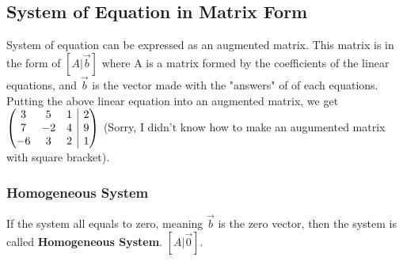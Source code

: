 \documentclass[12pt]{article}
\makeatletter
\newenvironment{amatrix}[1]{%
  \left(\begin{array}{@{}*{#1}{c}|c@{}}
}{%
  \end{array}\right)
}
\makeatother
\begin{document}
\subsection{System of Equation in Matrix Form}
System of equation can be expressed as an augmented matrix. This matrix is in the form of $[A|\vec{b}]$ where A is a matrix formed by the coefficients of the linear equations, and $\vec{b}$ is the vector made with the "answers" of of each equations. 
Putting the above linear equation into an augmented matrix, we get 
$
\begin{amatrix}{3}
   3 & 5 & 1 &2 \\ 7 & -2 &4 &9\\-6&3&2&1\\ 
 \end{amatrix}
$
(Sorry, I didn't know how to make an augumented matrix with square bracket).\\
\subsubsection{Homogeneous System}
If the system all equals to zero, meaning $\vec{b}$ is the zero vector, then the system is called \textbf{Homogeneous System}. $[A|\vec{0}]$.
\end{document}

